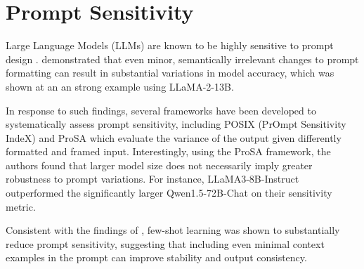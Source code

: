 \section{Prompt Sensitivity}

Large Language Models (LLMs) are known to be highly sensitive to prompt design \cite{sclar2023quantifying, gao2020making, jiang2020can}. \citep{sclar2023quantifying} demonstrated that even minor, semantically irrelevant changes to prompt formatting can result in substantial variations in model accuracy, which was shown at an an strong example using LLaMA-2-13B. 

In response to such findings, several frameworks have been developed to systematically assess prompt sensitivity, including POSIX (PrOmpt Sensitivity IndeX) \citep{chatterjee2024posix} and ProSA \citep{zhuo2024prosa} which evaluate the variance of the output given differently formatted and framed input. Interestingly, using the ProSA framework, the authors found that larger model size does not necessarily imply greater robustness to prompt variations. For instance, LLaMA3-8B-Instruct outperformed the significantly larger Qwen1.5-72B-Chat on their sensitivity metric.

Consistent with the findings of \cite{chatterjee2024posix}, few-shot learning was shown to substantially reduce prompt sensitivity, suggesting that including even minimal context examples in the prompt can improve stability and output consistency.
